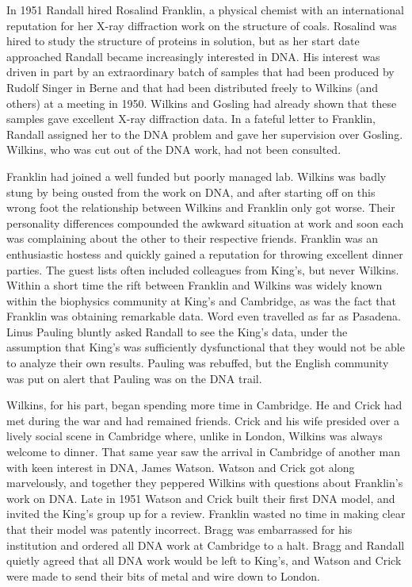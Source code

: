 \documentclass[12pt]{article}
\begin{document}
In 1951 Randall hired Rosalind Franklin, a physical chemist with an
international reputation for her X-ray diffraction work on the structure of
coals. Rosalind was hired to study the structure of proteins in solution, but
as her start date approached Randall became increasingly interested in DNA. His
interest was driven in part by an extraordinary batch of samples that had been
produced by Rudolf Singer in Berne and that had been distributed freely to
Wilkins (and others) at a meeting in 1950. Wilkins and Gosling had already
shown that these samples gave excellent X-ray diffraction data. In a fateful
letter to Franklin, Randall assigned her to the DNA problem and gave her
supervision over Gosling. Wilkins, who was cut out of the DNA work, had not
been consulted.

Franklin had joined a well funded but poorly managed lab. Wilkins was badly
stung by being ousted from the work on DNA, and after starting off on this
wrong foot the relationship between Wilkins and Franklin only got worse. Their
personality differences compounded the awkward situation at work and soon each
was complaining about the other to their respective friends. Franklin was an
enthusiastic hostess and quickly gained a reputation for throwing excellent
dinner parties. The guest lists often included colleagues from King's, but
never Wilkins. Within a short time the rift between Franklin and Wilkins was
widely known within the biophysics community at King's and Cambridge, as was
the fact that Franklin was obtaining remarkable data. Word even travelled as
far as Pasadena. Linus Pauling bluntly asked Randall to see the King's data,
under the assumption that King's was sufficiently dysfunctional that they would
not be able to analyze their own results. Pauling was rebuffed, but the English
community was put on alert that Pauling was on the DNA trail.

Wilkins, for his part, began spending more time in Cambridge. He and Crick had
met during the war and had remained friends. Crick and his wife presided over a
lively social scene in Cambridge where, unlike in London, Wilkins was always
welcome to dinner. That same year saw the arrival in Cambridge of another man
with keen interest in DNA, James Watson. Watson and Crick got along
marvelously, and together they peppered Wilkins with questions about Franklin's
work on DNA. Late in 1951 Watson and Crick built their first DNA model, and
invited the King's group up for a review. Franklin wasted no time in making
clear that their model was patently incorrect.  Bragg was embarrassed for his
institution and ordered all DNA work at Cambridge to a halt. Bragg and Randall
quietly agreed that all DNA work would be left to King's, and Watson and Crick
were made to send their bits of metal and wire down to London.
\end{document}
